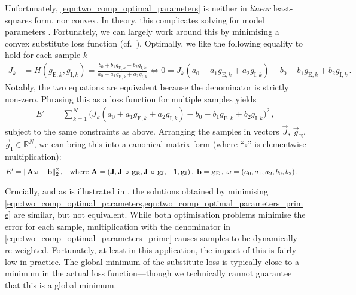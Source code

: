 Unfortunately, \cref{eqn:two_comp_optimal_parameters} is neither in \emph{linear} least-squares form, nor convex.
In theory, this complicates solving for model parameters \citep{rockafellar1993lagrange}.
Fortunately, we can largely work around this by minimising a convex substitute loss function (cf.~).
Optimally, we like the following equality to hold for each sample $k$
\begin{align*}
	J_k &= H(g_{\mathrm{E}, k}, g_{\mathrm{I}, k}) = \frac{
		b_0 + b_1 g_{\mathrm{E}, k} - b_2 g_{\mathrm{I}, k}
	}{
		a_0 + a_1 g_{\mathrm{E}, k} + a_2 g_{\mathrm{I}, k}
 	} \Leftrightarrow 0 = J_k (a_0 + a_1 g_{\mathrm{E}, k} + a_2 g_{\mathrm{I}, k}) - b_0 - b_1 g_{\mathrm{E}, k} + b_2 g_{\mathrm{I}, k} \,.
\end{align*}
Notably, the two equations are equivalent because the denominator is strictly non-zero.
Phrasing this as a loss function for multiple samples yields
\begin{align}
	E' &= \sum_{k = 1}^N \bigl( J_k (a_0 + a_1 g_{\mathrm{E}, k} + a_2 g_{\mathrm{I}, k}) - b_0 - b_1 g_{\mathrm{E}, k} + b_2 g_{\mathrm{I}, k} \bigr)^2 \,,
	\label{eqn:two_comp_optimal_parameters_prime}
\end{align}
subject to the same constraints as above.
Arranging the samples in vectors $\vec J$, $\vec g_\mathrm{E}$, $\vec g_\mathrm{I} \in \mathbb{R}^N$, we can bring this into a canonical matrix form (where \enquote{$\circ$} is elementwise multiplication):
\begin{align}
	E' &= \|\mathbf{A} \mathbf{\omega} - \mathbf{b} \|_2^2 \,, & \text{where } \mathbf{A} = (\mathbf{J}, \mathbf{J} \, \circ \,  \mathbf{g}_\mathrm{E}, \mathbf{J} \, \circ \, \mathbf{g}_\mathrm{I}, -\mathbf{1}, \mathbf{g}_\mathrm{I}) \,, \; \mathbf{b} = \mathbf{g}_\mathrm{E} \,, \; \mathbf{\omega} &= (a_0, a_1, a_2, b_0, b_2) \,.
	\label{eqn:two_comp_optimal_parameters_prime_matrix}
\end{align}

Crucially, and as is illustrated in , the solutions obtained by minimising \cref{eqn:two_comp_optimal_parameters,eqn:two_comp_optimal_parameters_prime} are similar, but not equivalent.
While both optimisation problems minimise the error for each sample, multiplication with the denominator in \cref{eqn:two_comp_optimal_parameters_prime} causes samples to be dynamically re-weighted.
Fortunately, at least in this application, the impact of this is fairly low in practice.
The global minimum of the substitute loss is typically close to a minimum in the actual loss function---though we technically cannot guarantee that this is a global minimum.

